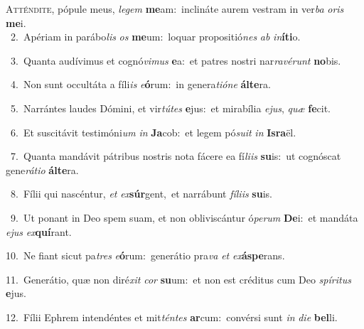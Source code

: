 \lettrine{\initial\textcolor{\initialcolor}{A}}{tténdite,} pópule meus, \textit{le}\-\textit{gem} \textbf{me}\-am:~\star inclináte aurem vestram in ver\textit{ba} \textit{o}\-\textit{ris} \textbf{me}\-i.\\
{\numbfont\textcolor{\numbcolor}{~2.}}~Apériam in parábo\textit{lis} \textit{os} \textbf{me}\-um:~\star loquar propositió\textit{nes} \textit{ab} \textit{in}\-\textbf{í}\textbf{ti}o.\par
{\numbfont\textcolor{\numbcolor}{~3.}}~Quanta audívimus et cognó\-\textit{vi}\-\textit{mus} \textbf{e}\-a:~\star et patres nostri nar\-\textit{ra}\-\textit{vé}\textit{runt} \textbf{no}\-bis.\par
{\numbfont\textcolor{\numbcolor}{~4.}}~Non sunt occultáta a fíli\textit{is} \textit{e}\-\textbf{ó}rum:~\star in genera\-\textit{ti}\-\textit{ó}\textit{ne} \textbf{ál}\-\textbf{te}ra.\par
{\numbfont\textcolor{\numbcolor}{~5.}}~Narrántes laudes Dómini, et vir\-\textit{tú}\-\textit{tes} \textbf{e}\-jus:~\star et mirabília \textit{e}\-\textit{jus}, \textit{quæ} \textbf{fe}\-cit.\par
{\numbfont\textcolor{\numbcolor}{~6.}}~Et suscitávit testimóni\textit{um} \textit{in} \textbf{Ja}\-cob:~\star et legem pó\-\textit{su}\-\textit{it} \textit{in} \textbf{Is}\-\textbf{ra}ël.\par
{\numbfont\textcolor{\numbcolor}{~7.}}~Quanta mandávit pátribus nostris nota fácere ea fí\-\textit{li}\-\textit{is} \textbf{su}\-is:~\star ut cognóscat gene\-\textit{rá}\-\textit{ti}\textit{o} \textbf{ál}\-\textbf{te}ra.\par
{\numbfont\textcolor{\numbcolor}{~8.}}~Fílii qui nascéntur, \textit{et} \textit{ex}\-\textbf{súr}gent,~\star et narrábunt \textit{fí}\-\textit{li}\textit{is} \textbf{su}\-is.\par
{\numbfont\textcolor{\numbcolor}{~9.}}~Ut ponant in Deo spem suam, et non obliviscántur ó\-\textit{pe}\-\textit{rum} \textbf{De}\-i:~\star et mandáta \textit{e}\-\textit{jus} \textit{ex}\-\textbf{quí}rant.\par
{\numbfont\textcolor{\numbcolor}{10.}}~Ne fiant sicut pa\textit{tres} \textit{e}\-\textbf{ó}rum:~\star generátio pra\textit{va} \textit{et} \textit{ex}\-\textbf{ás}\textbf{pe}rans.\par
{\numbfont\textcolor{\numbcolor}{11.}}~Generátio, quæ non diré\textit{xit} \textit{cor} \textbf{su}\-um:~\star et non est créditus cum Deo \textit{spí}\-\textit{ri}\textit{tus} \textbf{e}\-jus.\par
{\numbfont\textcolor{\numbcolor}{12.}}~Fílii Ephrem intendéntes et mit\-\textit{tén}\-\textit{tes} \textbf{ar}\-cum:~\star convérsi sunt \textit{in} \textit{di}\-\textit{e} \textbf{bel}\-li.\par
